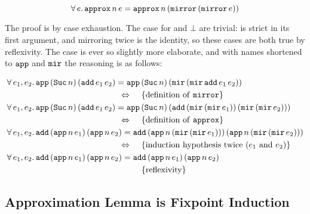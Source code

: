 \begin{equation*}
\fa{e}  \hs{approx} \, n \, e = \hs{approx} \, n \, (\hs{mirror} \, (\hs{mirror} \, e))
\end{equation*}

The proof is by case exhaustion. The case for  and $\bot$
are trivial:  is strict in its first argument, and
mirroring  twice is the identity, so these cases are both
true by reflexivity. The  case is ever so slightly more
elaborate, and with names shortened to $\hs{app}$ and $\hs{mir}$ the
reasoning is as follows:

\newcommand{\Adds}[2]{\hs{add} \, #1 e_1 #2 \, #1 e_2 #2}
\newcommand{\Approxn}[0]{\hs{app} \, n \,}
\newcommand{\ApproxSucn}[0]{\hs{app} \, (\hs{Suc} \, n) \,}
\newcommand{\mirmir}[0]{\hs{mir} \, (\hs{mir} \, }
\begin{align*}
\faa{e_1}{e_2}&  \ApproxSucn (\Adds{}{})  = \ApproxSucn (\mirmir \Adds{}{} ))                                                                   \\
                                                                                 \desclra{\defof{\texttt{mirror}}}                                   \\
\faa{e_1}{e_2}&  \ApproxSucn (\Adds{}{})  = \ApproxSucn (\Adds{(\mirmir}{))})                                                                    \\
                                                                                \desclra{\defof{\texttt{approx}}}                                    \\
\faa{e_1}{e_2}&  \Adds{(\Approxn}{)}      = \Adds{(\Approxn(\mirmir}{)))}                                                                        \\
                                                                                \desclra{induction hypothesis twice ($e_1$ and $e_2$)} \\
\faa{e_1}{e_2}&  \Adds{(\Approxn}{)}      = \Adds{(\Approxn}{)}                                                                                  \\
                                                                                \desca{reflexivity}                                              \\
\end{align*}

\subsection{Approximation Lemma is Fixpoint Induction}

